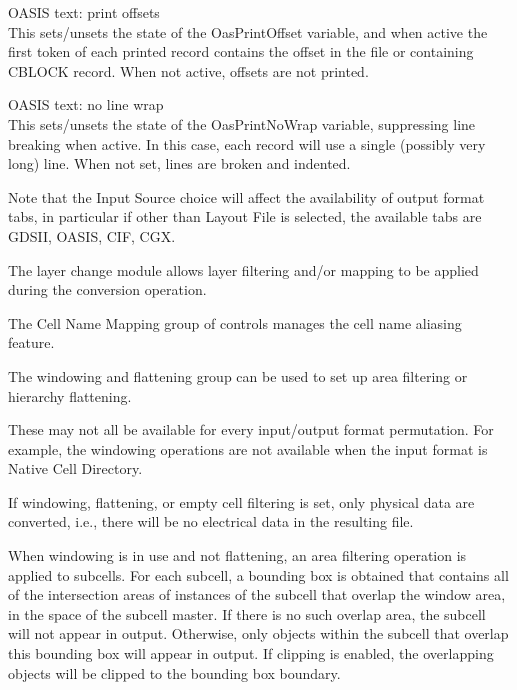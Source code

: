 \begin{description}
\begin{description}
\item{\cb OASIS text: print offsets}\\
This sets/unsets the state of the {\et OasPrintOffset} variable, and
when active the first token of each printed record contains the offset
in the file or containing CBLOCK record.  When not active, offsets are
not printed.

\item{\cb OASIS text: no line wrap}\\
This sets/unsets the state of the {\et OasPrintNoWrap} variable,
suppressing line breaking when active.  In this case, each record will
use a single (possibly very long) line.  When not set, lines are
broken and indented.
\end{description}
\end{description}

Note that the {\cb Input Source} choice will affect the availability
of output format tabs, in particular if other than {\cb Layout File}
is selected, the available tabs are {\cb GDSII}, {\cb OASIS}, {\cb
CIF}, {\cb CGX}.

The layer change module allows layer filtering and/or mapping to be
applied during the conversion operation.

The {\cb Cell Name Mapping} group of controls manages the cell
name aliasing feature.

The windowing and flattening group can be used to set up area
filtering or hierarchy flattening.

These may not all be available for every input/output format
permutation.  For example, the windowing operations are not available
when the input format is {\cb Native Cell Directory}.

If windowing, flattening, or empty cell filtering is set, only
physical data are converted, i.e., there will be no electrical data in
the resulting file.

When windowing is in use and not flattening, an area filtering
operation is applied to subcells.  For each subcell, a bounding box is
obtained that contains all of the intersection areas of instances of
the subcell that overlap the window area, in the space of the subcell
master.  If there is no such overlap area, the subcell will not appear
in output.  Otherwise, only objects within the subcell that overlap
this bounding box will appear in output.  If clipping is enabled, the
overlapping objects will be clipped to the bounding box boundary.

